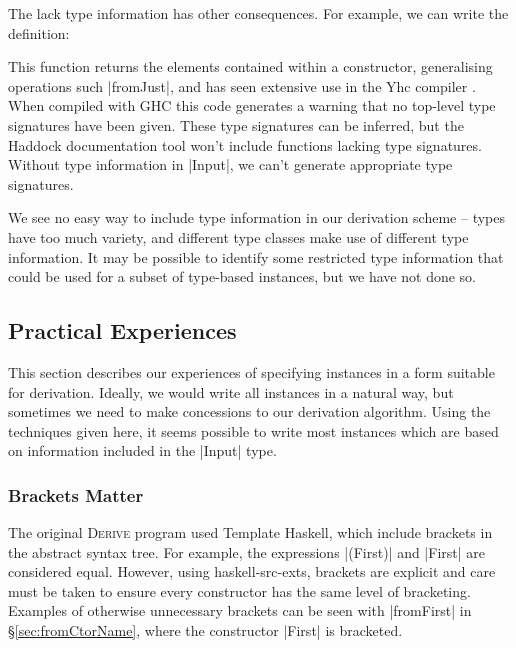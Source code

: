 \documentclass{llncs}
\newcommand{\derive}{\textsc{Derive}}
\begin{document}
The lack type information has other consequences. For example, we can write the definition:


\noindent This function returns the elements contained within a constructor, generalising operations such |fromJust|, and has seen extensive use in the Yhc compiler \cite{yhc}. When compiled with GHC this code generates a warning that no top-level type signatures have been given. These type signatures can be inferred, but the Haddock documentation tool \cite{haddock} won't include functions lacking type signatures. Without type information in |Input|, we can't generate appropriate type signatures.

We see no easy way to include type information in our derivation scheme -- types have too much variety, and different type classes make use of different type information. It may be possible to identify some restricted type information that could be used for a subset of type-based instances, but we have not done so.

\subsection{Practical Experiences}

This section describes our experiences of specifying instances in a form suitable for derivation. Ideally, we would write all instances in a natural way, but sometimes we need to make concessions to our derivation algorithm. Using the techniques given here, it seems possible to write most instances which are based on information included in the |Input| type.

\subsubsection{Brackets Matter}

The original \derive{} program used Template Haskell, which include brackets in the abstract syntax tree. For example, the expressions |(First)| and |First| are considered equal. However, using haskell-src-exts, brackets are explicit and care must be taken to ensure every constructor has the same level of bracketing. Examples of otherwise unnecessary brackets can be seen with |fromFirst| in \S\ref{sec:fromCtorName}, where the constructor |First| is bracketed.
\end{document}
